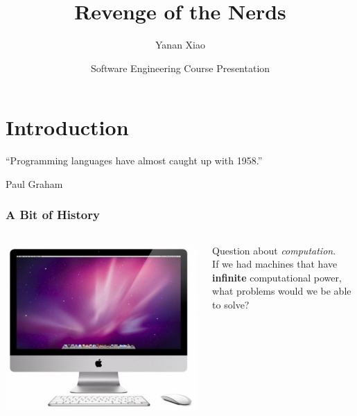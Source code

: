 \documentclass[12pt,hyperref=true,mathserif]{beamer}
\begin{document}
\title{Revenge of the Nerds}
\author{Yanan Xiao}
\date[CIS502 Presentation]{Software Engineering Course Presentation}

\begin{frame}
\titlepage
\end{frame}

\begin{frame}
  \tableofcontents
\end{frame}

\section{Introduction}


\begin{frame}
\begin{center}
``Programming languages have almost caught up with 1958.''
\end{center}
\hfill Paul Graham  
\end{frame}

\begin{frame}
  \frametitle{A Bit of History}
  \begin{columns}
    \begin{column}{0.5\textwidth}
      \includegraphics[scale=0.3]{Figure/iMac-500}
    \end{column}
    \begin{column}{0.5\textwidth}
      Question about \emph{computation}.\\[4pt]
      If we had machines that have \textbf{infinite}
      computational power,\\
      what problems would we be able to solve?
    \end{column}
  \end{columns}
  
\end{frame}
\end{document}
